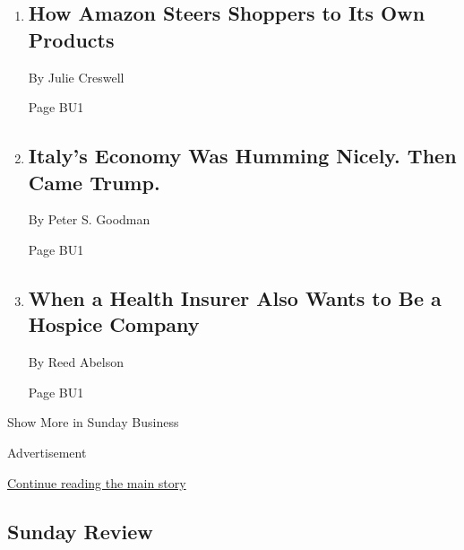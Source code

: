 \begin{enumerate}
\def\labelenumi{\arabic{enumi}.}
\item
  \href{/2018/06/23/business/amazon-the-brand-buster.html}{}

  \hypertarget{how-amazon-steers-shoppers-to-its-own-products-1}{%
  \subsection{How Amazon Steers Shoppers to Its Own
  Products}\label{how-amazon-steers-shoppers-to-its-own-products-1}}

  By Julie Creswell

  Page BU1
\item
  \href{/2018/06/22/business/italy-economy-trade-war-iran-sanctions.html}{}

  \hypertarget{italys-economy-was-humming-nicely-then-came-trump-1}{%
  \subsection{Italy's Economy Was Humming Nicely. Then Came
  Trump.}\label{italys-economy-was-humming-nicely-then-came-trump-1}}

  By Peter S. Goodman

  Page BU1
\item
  \href{/2018/06/22/health/hospice-humana-private-equity.html}{}

  \hypertarget{when-a-health-insurer-also-wants-to-be-a-hospice-company-1}{%
  \subsection{When a Health Insurer Also Wants to Be a Hospice
  Company}\label{when-a-health-insurer-also-wants-to-be-a-hospice-company-1}}

  By Reed Abelson

  Page BU1
\end{enumerate}

Show More in Sunday Business

Advertisement

\protect\hyperlink{after-mid4}{Continue reading the main story}

\hypertarget{sunday-review}{%
\subsection{Sunday Review}\label{sunday-review}}

